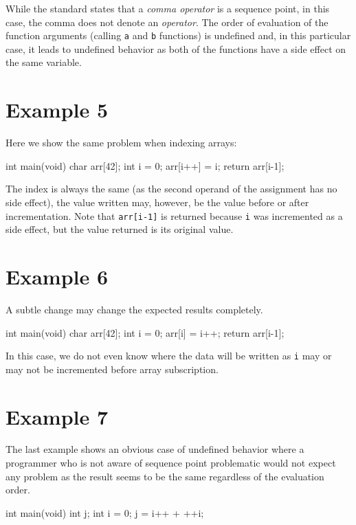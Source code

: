 While the standard states that a \emph{comma operator} is a sequence point, in this case, the comma does not denote an \emph{operator}. The order of evaluation of the function arguments (calling \verb|a| and \verb|b| functions) is undefined and, in this particular case, it leads to undefined behavior as both of the functions have a side effect on the same variable.

\section{Example 5}\label{example5}
Here we show the same problem when indexing arrays:
\\\begin{code}
int main(void){
    char arr[42];
    int i = 0;
    arr[i++] = i;
    return arr[i-1];
}
\end{code}

The index is always the same (as the second operand of the assignment has no side effect), the value written may, however, be the value before or after incrementation. Note that \verb|arr[i-1]| is returned because \verb|i| was incremented as a side effect, but the value returned is its original value.

\section{Example 6}\label{example6}
A subtle change may change the expected results completely.
\\\begin{code}
int main(void){
    char arr[42];
    int i = 0;
    arr[i] = i++;
    return arr[i-1];
}
\end{code}

In this case, we do not even know where the data will be written as \verb|i| may or may not be incremented before array subscription.

\section{Example 7}\label{example7}
The last example shows an obvious case of undefined behavior where a programmer who is not aware of sequence point problematic would not expect any problem as the result seems to be the same regardless of the evaluation order.
\\\begin{code}
int main(void){
    int j;
    int i = 0;
    j = i++ + ++i;
}
\end{code}

